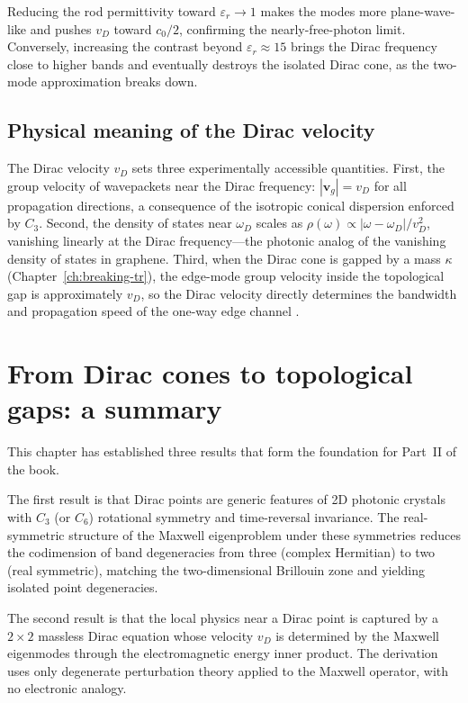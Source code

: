 Reducing the rod permittivity toward $\varepsilon_r\to 1$
makes the modes more plane-wave-like and pushes $v_D$ toward
$c_0/2$, confirming the nearly-free-photon limit.  Conversely,
increasing the contrast beyond $\varepsilon_r\approx 15$ brings the
Dirac frequency close to higher bands and eventually destroys the
isolated Dirac cone, as the two-mode approximation breaks down.

\subsection{Physical meaning of the Dirac velocity}
\label{sec:ch6-vD-physical}

The Dirac velocity $v_D$ sets three experimentally accessible
quantities.  First, the group velocity of wavepackets near the Dirac
frequency: $|\mathbf{v}_g|=v_D$ for all propagation directions,
a consequence of the isotropic conical dispersion enforced by $C_3$.
Second, the density of states near $\omega_D$ scales as
$\rho(\omega)\propto|\omega-\omega_D|/v_D^2$, vanishing linearly at
the Dirac frequency---the photonic analog of the vanishing density of
states in graphene.  Third, when the Dirac cone is gapped by a mass
$\kappa$ (Chapter~\ref{ch:breaking-tr}), the edge-mode group velocity
inside the topological gap is approximately $v_D$, so the Dirac
velocity directly determines the bandwidth and propagation speed of
the one-way edge channel \cite{ozawa2018topological}.

\section{From Dirac cones to topological gaps: a summary}
\label{sec:ch6-summary}

This chapter has established three results that form the foundation for
Part~II of the book.

The first result is that Dirac points are generic features of 2D
photonic crystals with $C_3$ (or $C_6$) rotational symmetry and
time-reversal invariance.  The real-symmetric structure of the Maxwell
eigenproblem under these symmetries reduces the codimension of band
degeneracies from three (complex Hermitian) to two (real symmetric),
matching the two-dimensional Brillouin zone and yielding isolated
point degeneracies.

The second result is that the local physics near a Dirac point is
captured by a $2\times 2$ massless Dirac equation whose velocity
$v_D$ is determined by the Maxwell eigenmodes through the
electromagnetic energy inner product.  The derivation uses only
degenerate perturbation theory applied to the Maxwell operator,
with no electronic analogy.

